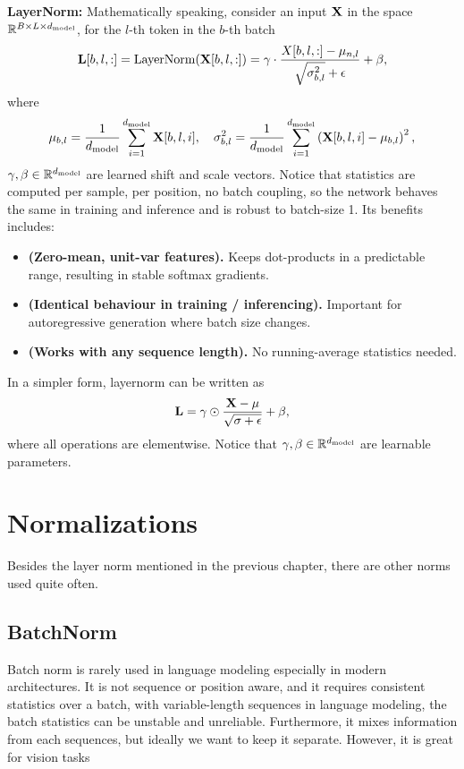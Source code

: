 \documentclass[11pt]{article}  %
\begin{document}
\textbf{LayerNorm:} Mathematically speaking, consider an input $\mathbf{X}$ in the space $\mathbb{R}^{B \times L \times d_{\text{model}}}$, for the $l$-th token in the $b$-th batch
\begin{align*}
  \mathbf{L}[b, l, :] = \text{LayerNorm}(\mathbf{X}[b, l, :]) = \gamma \cdot \frac{X[b, l, :] - \mu_{n, l}}{\sqrt{\sigma^2_{b, l}} + \epsilon} + \beta, 
\end{align*}
where 
\begin{align*}
  \mu_{b, l} = \frac{1}{d_{\text{model}}}\sum_{i=1}^{d_{\text{model}}}\mathbf{X}[b, l, i], \quad \sigma^2_{b, l} = \frac{1}{d_{\text{model}}}\sum_{i=1}^{d_{\text{model}}}\left( \mathbf{X}[b, l, i] - \mu_{b, l} \right)^2,
\end{align*}
$\gamma, \beta \in \mathbb{R}^{d_{\text{model}}}$ are learned shift and scale vectors.
Notice that statistics are computed per sample, per position, no batch coupling, so the network behaves the same in training and inference and is robust to batch-size 1. 
Its benefits includes: 
\begin{itemize}
  \item {\bf (Zero-mean, unit-var features).} Keeps dot-products in a predictable range, resulting in stable softmax gradients.
  \item {\bf (Identical behaviour in training / inferencing).} Important for autoregressive generation where batch size changes.
  \item {\bf (Works with any sequence length).} No running-average statistics needed.
\end{itemize}
In a simpler form, layernorm can be written as 
\begin{align*}
  \mathbf{L} = \gamma \odot \frac{\mathbf{X} - \mu}{\sqrt{\sigma + \epsilon}} + \beta,
\end{align*}
where all operations are elementwise.
Notice that $\gamma, \beta \in \mathbb{R}^{d_{\text{model}}}$ are learnable parameters.




\section{Normalizations}
Besides the layer norm mentioned in the previous chapter, there are other norms used quite often.

\subsection{BatchNorm}
Batch norm is rarely used in language modeling especially in modern architectures. 
It is not sequence or position aware, and it requires consistent statistics over a batch, with variable-length sequences in language modeling, the batch statistics can be unstable and unreliable.
Furthermore, it mixes information from each sequences, but ideally we want to keep it separate. 
However, it is great for vision tasks
\end{document}
